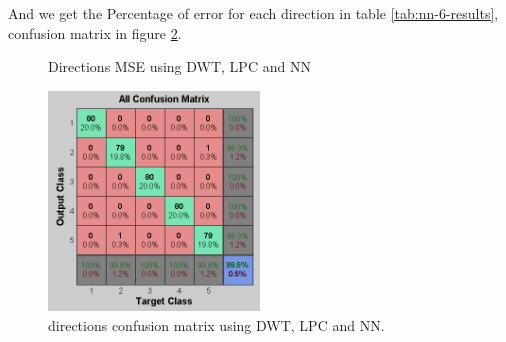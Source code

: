 \documentclass[12pt, a4paper, twoside]{report}
\begin{document}
And we get the Percentage of error for each direction in table \ref{tab:nn-6-results}, confusion matrix in figure \ref{fig:nn-5}.
\begin{figure}[!h]
\begin{floatrow}
{%
  \caption{Directions MSE using DWT, LPC and NN}
  \label{fig:nn-mse-2}
}
\end{floatrow}
\end{figure}

\begin{figure}[!h]
	\centering
	\includegraphics[width=0.5\textwidth]
	{images/chapter5/nn-5}
	\caption{directions confusion matrix using DWT, LPC and NN.}
	\label{fig:nn-5}
\end{figure}
\end{document}
